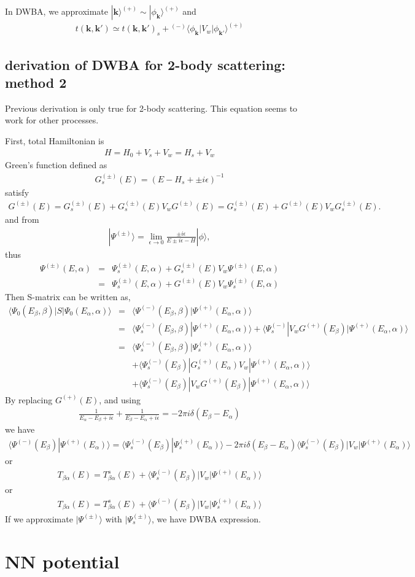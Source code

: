 \documentclass[10pt]{article}
\def\bm{\boldsymbol}
\newcommand{\bea}{\begin{eqnarray}}
\newcommand{\eea}{\end{eqnarray}}
\newcommand{\no}{\nonumber \\}
\def\vk{{\bm k}}
\def\la{\langle}
\def\ra{\rangle}
\begin{document}
In DWBA, we approximate $|\vk\ra^{(+)}\sim |\phi_\vk\ra^{(+)}$ and
\bea
t(\vk,\vk')\simeq t(\vk,\vk')_s+{}^{(-)}\la\phi_\vk| V_w|\phi_{\vk'}\ra^{(+)}
\eea


\subsection{derivation of DWBA for 2-body scattering: method 2}
Previous derivation is only true for 2-body scattering.
This equation seems to work for other processes.

First, total Hamiltonian is 
\bea
H=H_0+V_s+V_w=H_s+V_w
\eea
Green's function defined as
\bea
G^{(\pm)}_s(E)=(E-H_s+\pm i\epsilon)^{-1}
\eea
satisfy 
\bea
G^{(\pm)}(E)=G^{(\pm)}_s(E)+G^{(\pm)}_s(E) V_w G^{(\pm)}(E)
            =G^{(\pm)}_s(E)+G^{(\pm)}(E) V_w G^{(\pm)}_s(E).  
\eea
and from
\bea
|\Psi^{(\pm)}\ra=\lim_{\epsilon\to 0} \frac{\pm i\epsilon}{E\pm i\epsilon-H}|\phi\ra,
\eea
thus
\bea
\Psi^{(\pm)}(E,\alpha)&=&
\Psi_s^{(\pm)}(E,\alpha)+G_s^{(\pm)}(E)V_w\Psi^{(\pm)}(E,\alpha)
\no &=&\Psi_s^{(\pm)}(E,\alpha)+G^{(\pm)}(E)V_w\Psi^{(\pm)}_s(E,\alpha)
\eea
Then S-matrix can be written as,
\bea
\la \Psi_0(E_\beta,\beta)|S|\Psi_0(E_\alpha,\alpha)\ra
&=&\la \Psi^{(-)}(E_\beta,\beta)|\Psi^{(+)}(E_\alpha,\alpha)\ra
\no
&=&\la \Psi_s^{(-)}(E_\beta,\beta)|\Psi^{(+)}(E_\alpha,\alpha)\ra
 +\la \Psi^{(-)}_s|V_w G^{(+)}(E_\beta)|\Psi^{(+)}(E_\alpha,\alpha)\ra \no
&=&\la \Psi^{(-)}_s(E_\beta,\beta)|\Psi^{(+)}_s(E_\alpha,\alpha)\ra
\no & &
 +\la \Psi^{(-)}_s(E_\beta)|G^{(+)}_s(E_\alpha)V_w|\Psi^{(+)}(E_\alpha,\alpha)\ra \no & &
 +\la \Psi^{(-)}_s(E_\beta)|V_w G^{(+)}(E_\beta)|\Psi^{(+)}(E_\alpha,\alpha)\ra   
\eea
By replacing $G^{(+)}(E)$, and using
\bea
\frac{1}{E_\alpha-E_\beta+i\epsilon}+\frac{1}{E_\beta-E_\alpha+i\epsilon}
=-2\pi i\delta(E_\beta-E_\alpha)
\eea
we have
\bea
\la \Psi^{(-)}(E_\beta)|\Psi^{(+)}(E_\alpha)\ra
=\la \Psi^{(-)}_s(E_\beta)|\Psi^{(+)}_s(E_\alpha)\ra
-2\pi i\delta(E_\beta-E_\alpha)
\la \Psi^{(-)}_s(E_\beta)|V_w|\Psi^{(+)}(E_\alpha)\ra 
\eea
or
\bea
T_{\beta\alpha}(E)=T^s_{\beta\alpha}(E)+\la \Psi^{(-)}_s(E_\beta)|V_w|\Psi^{(+)}(E_\alpha)\ra 
\eea
or
\bea
T_{\beta\alpha}(E)=T^s_{\beta\alpha}(E)+\la \Psi^{(-)}(E_\beta)|V_w|\Psi^{(+)}_s(E_\alpha)\ra 
\eea
If we approximate $|\Psi^{(\pm)}\ra$ with $|\Psi_s^{(\pm)}\ra$,
we have DWBA expression.


\section{NN potential}
 
\end{document}
